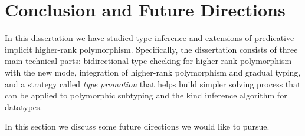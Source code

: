 \chapter{Conclusion and Future Directions}
\label{chap:future}

In this dissertation we have studied type inference and extensions of
predicative implicit higher-rank polymorphism. Specifically, the dissertation
consists of three main technical parts: bidirectional type checking for
higher-rank polymorphism with the new \textit{\mode} mode, integration of
higher-rank polymorphism and gradual typing, and a strategy called \textit{type
  promotion} that helps build simpler solving process that can be applied to polymorphic
subtyping and the kind inference algorithm for datatypes.

In this section we discuss some future directions we would like to pursue.




